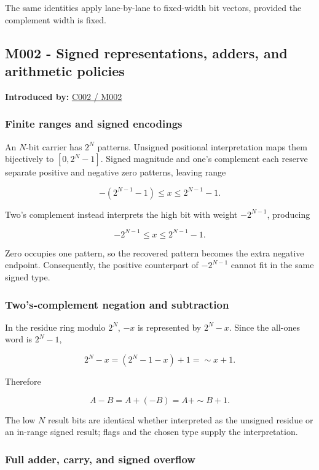 The same identities apply lane-by-lane to fixed-width bit vectors, provided the complement width is fixed.

\subsection{M002 - Signed representations, adders, and arithmetic policies}\label{m002---signed-representations-adders-and-arithmetic-policies}

\textbf{Introduced by:} \hyperref[01-foundations-i-ch001]{C002 / M002}

\subsubsection{Finite ranges and signed encodings}\label{finite-ranges-and-signed-encodings}

An \(N\)-bit carrier has \(2^N\) patterns. Unsigned positional interpretation maps them bijectively to \([0,2^N-1]\). Signed magnitude and one's complement each reserve separate positive and negative zero patterns, leaving range

\[
-(2^{N-1}-1)\le x\le2^{N-1}-1.
\]

Two's complement instead interprets the high bit with weight \(-2^{N-1}\), producing

\[
-2^{N-1}\le x\le2^{N-1}-1.
\]

Zero occupies one pattern, so the recovered pattern becomes the extra negative endpoint. Consequently, the positive counterpart of \(-2^{N-1}\) cannot fit in the same signed type.

\subsubsection{Two's-complement negation and subtraction}\label{twos-complement-negation-and-subtraction}

In the residue ring modulo \(2^N\), \(-x\) is represented by \(2^N-x\). Since the all-ones word is \(2^N-1\),

\[
2^N-x=(2^N-1-x)+1=\sim x+1.
\]

Therefore

\[
A-B=A+(-B)=A+\sim B+1.
\]

The low \(N\) result bits are identical whether interpreted as the unsigned residue or an in-range signed result; flags and the chosen type supply the interpretation.

\subsubsection{Full adder, carry, and signed overflow}\label{full-adder-carry-and-signed-overflow}

